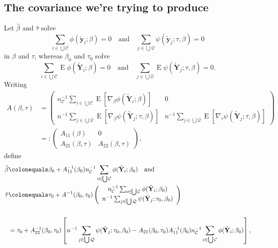 \documentclass{article}
\newcommand{\defeq}{\ensuremath{\colonequals}}
\newcommand{\EE}{\operatorname{E}}
\begin{document}
\subsection{The covariance we're trying to produce}

Let $\hat\beta$ and $\hat\tau$ solve
\[\sum_{i\in \bigcup \mathcal{C}}\phi(\tilde{\mathbf{y}}_{i}; \beta )
  =0\quad\text{and}\quad
\sum_{j\in \bigcup \mathcal{Q}}\psi(\tilde{\mathbf{y}}_{j}; \tau, \beta )  =0
  \]
  in $\beta$ and $\tau$, whereas $\beta_{0}$ and $\tau_{0}$ solve 
\[\sum_{i\in \bigcup \mathcal{C}}\EE\phi(\tilde{\mathbf{Y}}_{i}; \beta )
  =0\quad\text{and}\quad
\sum_{j\in \bigcup \mathcal{Q}}\EE\psi(\tilde{\mathbf{Y}}_{j}; \tau, \beta )  =0.
  \]
  Writing
  \begin{align*}
    A(\beta, \tau) &= \left(
      \begin{array}{cc}
        n_{\mathcal{C}}^{-1}\sum_{i\in \bigcup
        \mathcal{C}}\EE [\nabla_{\beta}\phi(\tilde{\mathbf{Y}}_{i};
        \beta )]&0\\
        n^{-1}\sum_{j\in \bigcup
        \mathcal{Q}}\EE[ \nabla_{\beta}\psi(\tilde{\mathbf{Y}}_{j};
        \tau, \beta )]  & n^{-1}\sum_{j\in \bigcup
        \mathcal{Q}}\EE[ \nabla_{\tau}\psi(\tilde{\mathbf{Y}}_{j};
        \tau, \beta )]
      \end{array}
    \right)\\
    &=:\left(
      \begin{array}{cc}
        A_{11}(\beta)& 0\\
        A_{21}(\beta, \tau) & A_{22}(\beta, \tau)
      \end{array}
\right),
  \end{align*}
  define 
  \begin{align*}
   \tilde\beta &\defeq \beta_{0} + A_{11}^{-1}(\beta_{0})n_{\mathcal{C}}^{-1}\sum_{i\in \bigcup \mathcal{C}}\phi(\tilde{\mathbf{Y}}_{i}; \beta_{0})
  \quad \text{and}\\
    \tilde\tau &\defeq \tau_{0} + A^{-1}(\beta_{0}, \tau_{0})\left(
    \begin{array}{c}
      n_{\mathcal{C}}^{-1}\sum_{i\in \bigcup
      \mathcal{C}}\phi(\tilde{\mathbf{Y}}_{i}; \beta_{0})\\
      n^{-1}\sum_{j\in \bigcup
                 \mathcal{Q}}\psi(\tilde{\mathbf{Y}}_{j};
                 \tau_{0},\beta_{0} )
    \end{array}
\right)\\
    \\
               &=\tau_{0} + A_{22}^{-1}(\beta_{0}, \tau_{0})\left[                 
                 n^{-1}\sum_{j\in \bigcup
                 \mathcal{Q}}\psi(\tilde{\mathbf{Y}}_{j};
                 \tau_{0},\beta_{0} ) - A_{21}(\beta_{0}, \tau_{0}) A_{11}^{-1}(\beta_{0})n_{\mathcal{C}}^{-1}\sum_{i\in \bigcup \mathcal{C}}\phi(\tilde{\mathbf{Y}}_{i}; \beta_{0})\right],
\end{align*}
\end{document}
